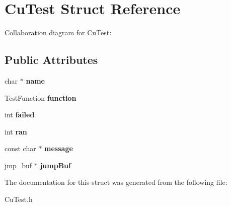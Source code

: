 \hypertarget{structCuTest}{}\section{Cu\+Test Struct Reference}
\label{structCuTest}


Collaboration diagram for Cu\+Test\+:
\subsection*{Public Attributes}
\begin{DoxyCompactItemize}
\item 
\mbox{\label{structCuTest_a6140dfce23321636d106d95efd4ccb93}} 
char $\ast$ {\bfseries name}
\item 
\mbox{\label{structCuTest_aac05c072bbf8b5ad2c1a1950633efbe5}} 
Test\+Function {\bfseries function}
\item 
\mbox{\label{structCuTest_af1334871dff4cf1e0e50d960952378e8}} 
int {\bfseries failed}
\item 
\mbox{\label{structCuTest_ae64f485765a24240e367d4a700855d24}} 
int {\bfseries ran}
\item 
\mbox{\label{structCuTest_a5d76ed2474dcc113ff4dd475db12b5a5}} 
const char $\ast$ {\bfseries message}
\item 
\mbox{\label{structCuTest_a7b96017be4b823324175a4aa9616def0}} 
jmp\+\_\+buf $\ast$ {\bfseries jump\+Buf}
\end{DoxyCompactItemize}


The documentation for this struct was generated from the following file\+:\begin{DoxyCompactItemize}
\item 
Cu\+Test.\+h\end{DoxyCompactItemize}
